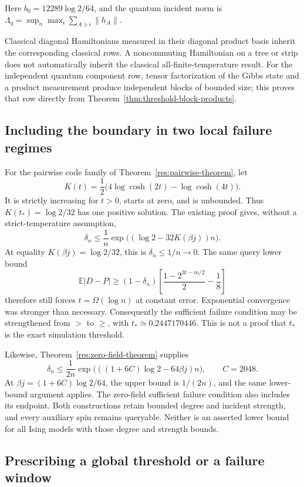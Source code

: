 Here $b_0=12289\log2/64$, and the quantum incident norm is
$\Lambda_q=\sup_n\max_i\sum_{A\ni i}\|h_A\|$.

Classical diagonal Hamiltonians measured in their diagonal product
basis inherit the corresponding classical rows. A noncommuting
Hamiltonian on a tree or strip does not automatically inherit the
classical all-finite-temperature result. For the independent quantum
component row, tensor factorization of the Gibbs state and a product
measurement produce independent blocks of bounded size; this proves
that row directly from Theorem~\ref{thm:threshold-block-products}.

\subsection{Including the boundary in two local failure regimes}
\label{sec:classification-local-endpoints}

For the pairwise code family of Theorem~\ref{res:pairwise-theorem}, let
\[
 K(t)=\frac12\bigl(4\log\cosh(2t)-\log\cosh(4t)\bigr).
\]
It is strictly increasing for $t>0$, starts at zero, and is unbounded.
Thus $K(t_*)=\log2/32$ has one positive solution. The existing proof
gives, without a strict-temperature assumption,
\[
 \delta_n\le\frac1n\exp\bigl((\log2-32K(\beta j))n\bigr).
\]
At equality $K(\beta j)=\log2/32$, this is $\delta_n\le1/n\to0$.
The same query lower bound
\[
 \mathbb E|D-P|\ge(1-\delta_n)
       \left[\frac{1-2^{3t-m/2}}2-\frac18\right]
\]
therefore still forces $t=\Omega(\log n)$ at constant error.
Exponential convergence was stronger than necessary. Consequently
the sufficient failure condition may be strengthened from $>$ to
$\ge$, with $t_*\simeq0.2447170446$. This is not a proof that $t_*$
is the exact simulation threshold.

Likewise, Theorem~\ref{res:zero-field-theorem} supplies
\[
 \delta_n\le\frac1{2n}
  \exp\bigl(((1+6C)\log2-64\beta j)n\bigr),\qquad C=2048.
\]
At $\beta j=(1+6C)\log2/64$, the upper bound is $1/(2n)$,
and the same lower-bound argument applies. The zero-field sufficient
failure condition also includes its endpoint. Both constructions
retain bounded degree and incident strength, and every auxiliary
spin remains queryable. Neither is an asserted lower bound for
all Ising models with those degree and strength bounds.

\subsection{Prescribing a global threshold or a failure window}
\label{sec:classification-prescribed-window}

